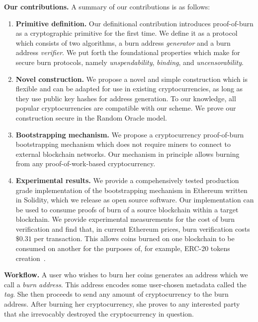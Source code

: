 \noindent
\textbf{Our contributions.}
A summary of our contributions is as follows:
\begin{enumerate}[wide, labelwidth=!, labelindent=0pt, label=(\roman*)]
    \item \textbf{Primitive definition.} Our definitional contribution introduces proof-of-burn as a cryptographic primitive for the first time. We
    define it as a protocol which consists of two algorithms, a burn address \emph{generator} and a burn address \emph{verifier}. We put forth the foundational properties which make for secure burn protocols, namely \emph{unspendability}, \emph{binding}, and \emph{uncensorability}.
    \item \textbf{Novel construction.} We propose a novel and simple construction which is flexible and can be adapted for use in existing cryptocurrencies, as long as they use public key hashes for address generation. To our knowledge, all popular cryptocurrencies are
    compatible with our scheme. We prove our construction secure in the Random Oracle model.
    \item \textbf{Bootstrapping mechanism.} We propose a cryptocurrency proof-of-burn bootstrapping mechanism which does not require miners to connect to external blockchain networks. Our mechanism in principle allows burning from any proof-of-work-based cryptocurrency.
    \item \textbf{Experimental results.} We provide a compehensively tested production grade implementation of the bootstrapping mechanism in Ethereum
    written in Solidity, which we release as open source software. Our implementation can be used to consume proofs of burn of a source blockchain
    within a target blockchain. We provide experimental measurements for the cost of burn verification and find that, in current Ethereum prices,
    burn verification costs $\$0.31$ per transaction.
    This allows coins burned on one blockchain to be consumed on another for the purposes of, for example, ERC-20 tokens creation~\cite{erc20}.
\end{enumerate}

\noindent
\textbf{Workflow.}
A user who wishes to burn her coins generates an address which we call a \emph{burn address}.
This address encodes some user-chosen metadata called the \emph{tag}. She then proceeds to send any amount of cryptocurrency to the burn address. After burning her cryptocurrency, she proves to any interested party that she irrevocably destroyed the cryptocurrency in question.

